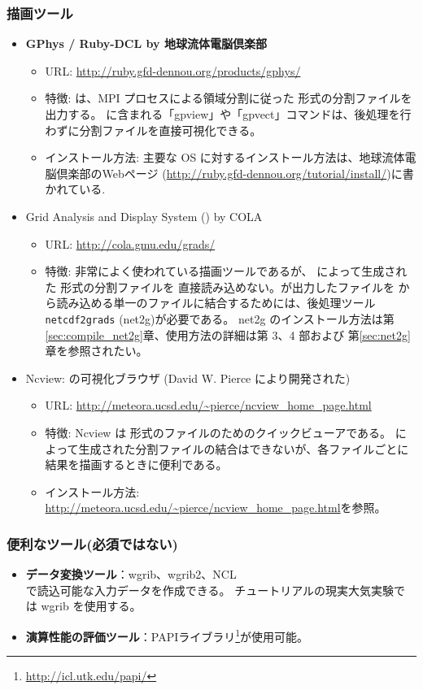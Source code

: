 \subsubsection{\bf 描画ツール}
\begin{itemize}
  \item {\bf GPhys / Ruby-DCL by 地球流体電脳倶楽部}
  \begin{itemize}
    \item URL: \url{http://ruby.gfd-dennou.org/products/gphys/}
    \item 特徴: {\scalelib}は、MPI プロセスによる領域分割に従った {\netcdf} 形式の分割ファイルを出力する。
    {\gphys}に含まれる「gpview」や「gpvect」コマンドは、後処理を行わずに分割ファイルを直接可視化できる。
    \item インストール方法: 主要な OS に対するインストール方法は、地球流体電脳倶楽部のWebページ
    (\url{http://ruby.gfd-dennou.org/tutorial/install/})に書かれている.
  \end{itemize}
  \item Grid Analysis and Display System ({\grads}) by COLA
  \begin{itemize}
    \item URL: \url{http://cola.gmu.edu/grads/}
    \item 特徴: 非常によく使われている描画ツールであるが、 \scalelib によって生成された {\netcdf}形式の分割ファイルを
    直接読み込めない。\scalelib が出力したファイルを {\grads} から読み込める単一のファイルに結合するためには、後処理ツール \verb|netcdf2grads| (net2g)が必要である。
    net2g のインストール方法は第\ref{sec:compile_net2g}章、使用方法の詳細は第 3、4 部および
    第\ref{sec:net2g}章を参照されたい。
 \end{itemize}
 \item Ncview: {\netcdf} の可視化ブラウザ (David W. Pierce により開発された)
  \begin{itemize}
  \item URL: \url{http://meteora.ucsd.edu/~pierce/ncview_home_page.html}
  \item 特徴: Ncview は {\netcdf}形式のファイルのためのクイックビューアである。
  \scalelib によって生成された分割ファイルの結合はできないが、各ファイルごとに結果を描画するときに便利である。
  \item インストール方法: \url{http://meteora.ucsd.edu/~pierce/ncview_home_page.html}を参照。
 \end{itemize}
\end{itemize}

\subsubsection{\bf 便利なツール(必須ではない)}
\begin{itemize}
  \item {\bf データ変換ツール}：wgrib、wgrib2、NCL \\
  \scalerm で読込可能な入力データを作成できる。
  チュートリアルの現実大気実験では wgrib を使用する。
  \item {\bf 演算性能の評価ツール}：PAPIライブラリ\footnote{\url{http://icl.utk.edu/papi/}}が使用可能。
\end{itemize}
